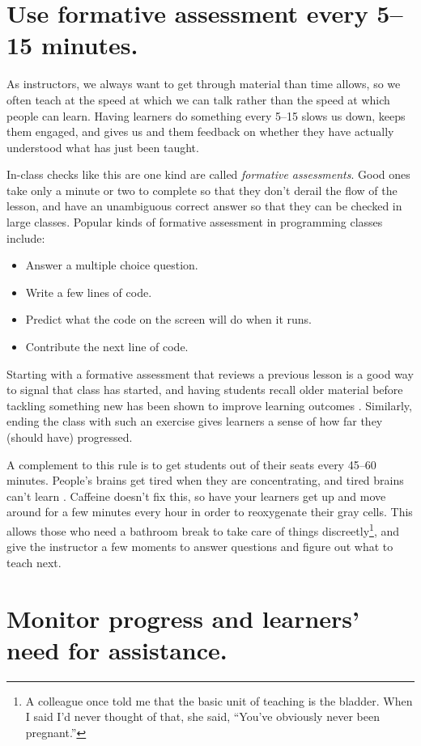 \documentclass[10pt,letterpaper]{article}
\newcommand{\rulemajor}[1]{\section{#1}}
\begin{document}
\rulemajor{Use formative assessment every 5--15 minutes.}

As instructors,
we always want to get through material than time allows,
so we often teach at the speed at which we can talk
rather than the speed at which people can learn.
Having learners do something every 5--15 slows us down,
keeps them engaged,
and gives us and them feedback on whether they have actually understood
what has just been taught.

In-class checks like this are one kind are called \emph{formative assessments}.
Good ones take only a minute or two to complete so that they don't derail the flow of the lesson,
and have an unambiguous correct answer so that they can be checked in large classes.
Popular kinds of formative assessment in programming classes include:

\begin{itemize}
  \item Answer a multiple choice question.
  \item Write a few lines of code.
  \item Predict what the code on the screen will do when it runs.
  \item Contribute the next line of code.
\end{itemize}

Starting with a formative assessment that reviews a previous lesson
is a good way to signal that class has started,
and having students recall older material before tackling something new
has been shown to improve learning outcomes \cite{Wein2018b}.
Similarly,
ending the class with such an exercise
gives learners a sense of how far they (should have) progressed.

A complement to this rule is to get students out of their seats every 45--60 minutes.
People's brains get tired when they are concentrating,
and tired brains can't learn \cite{Ambr2010,HPL2}.
Caffeine doesn't fix this,
so have your learners get up and move around for a few minutes every hour
in order to reoxygenate their gray cells.
This allows those who need a bathroom break to take care of things discreetly\footnote{A colleague once told me that
the basic unit of teaching is the bladder.
When I said I'd never thought of that,
she said, ``You've obviously never been pregnant.''},
and give the instructor a few moments to answer questions
and figure out what to teach next.

\rulemajor{Monitor progress and learners' need for assistance.}
\end{document}
